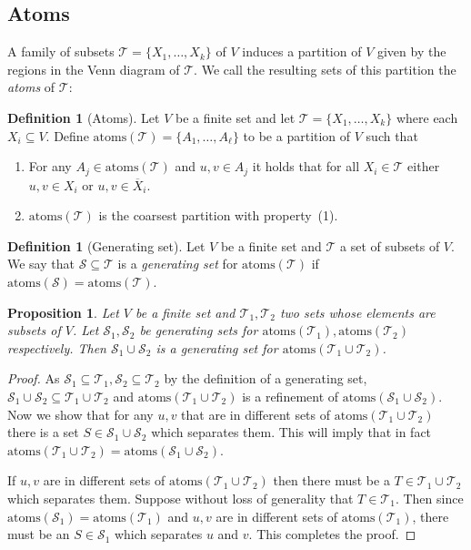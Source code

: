 \documentclass[10pt,a4paper]{article}
\newcommand{\Scal}{\mathcal{S}}
\newcommand{\Tcal}{\mathcal{T}}
\newcommand{\atoms}{\mathrm{atoms}}
\newcommand{\1}{\mathbf{1}}
\newtheorem{proposition}[theorem]{Proposition}
\theoremstyle{definition}
\newtheorem{definition}[theorem]{Definition}
\begin{document}
\subsection{Atoms}
A family of subsets $\Tcal = \{X_1,\ldots,X_k\}$ of $V$ induces a partition of $V$ given by the regions in the Venn diagram of $\Tcal$.
We call the resulting sets of this partition the \emph{atoms} of $\Tcal$:
\begin{definition}[Atoms]
Let $V$ be a finite set and let $\Tcal = \{X_1, \ldots, X_k\}$ where each $X_i  \subseteq V$.  Define $\atoms(\Tcal) = \{A_1, \ldots, A_\ell\}$ 
to be a partition of $V$ such that 
\begin{enumerate}
  \item For any $A_j \in \atoms(\Tcal)$ and $u,v \in A_j$ it holds that for all $X_i \in \Tcal$ either $u,v \in X_i$ or 
  $u,v \in \overline{X}_i$.
  \item $\atoms(\Tcal)$ is the coarsest partition with property~(1).
\end{enumerate}
\end{definition} 

\begin{definition}[Generating set]
Let $V$ be a finite set and $\Tcal$ a set of subsets of $V$.  We say that $\Scal \subseteq \Tcal$ is a \emph{generating set} for 
$\atoms(\Tcal)$ if $\atoms(\Scal) = \atoms(\Tcal)$.
\end{definition}

\begin{proposition}
\label{prop:atom_cup}
Let $V$ be a finite set and $\Tcal_1, \Tcal_2$ two sets whose elements are subsets of $V$.  Let $\Scal_1, \Scal_2$ be generating sets 
for $\atoms(\Tcal_1), \atoms(\Tcal_2)$ respectively.  Then $\Scal_1 \cup \Scal_2$ is a generating set for $\atoms(\Tcal_1 \cup \Tcal_2)$.
\end{proposition}

\begin{proof}
As $\Scal_1 \subseteq \Tcal_1, \Scal_2 \subseteq \Tcal_2$ by the definition of a generating set,
$\Scal_1 \cup \Scal_2 \subseteq \Tcal_1 \cup \Tcal_2$ and $\atoms(\Tcal_1 \cup \Tcal_2)$ is a refinement of $\atoms(\Scal_1 \cup \Scal_2)$.  
Now we show that for any $u,v$ that are in different sets of $\atoms(\Tcal_1 \cup \Tcal_2)$ there is a set $S \in \Scal_1 \cup \Scal_2$ which 
separates them.  This will imply that in fact $\atoms(\Tcal_1 \cup \Tcal_2) = \atoms(\Scal_1 \cup \Scal_2)$.

If $u,v$ are in different sets of $\atoms(\Tcal_1 \cup \Tcal_2)$ then there must be a $T \in \Tcal_1 \cup \Tcal_2$ which separates them.  Suppose 
without loss of generality that $T \in \Tcal_1$.  Then since $\atoms(\Scal_1) = \atoms(\Tcal_1)$ and $u,v$ are in different sets of $\atoms(\Tcal_1)$, 
there must be an $S \in \Scal_1$ which separates $u$ and $v$.  This completes the proof.
\end{proof}
\end{document}
